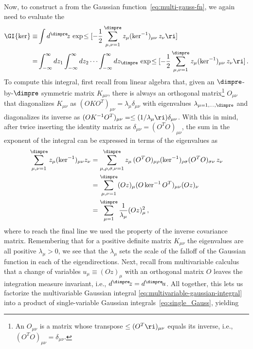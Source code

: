 Now, to construct a  from the Gaussian function~\eqref{eq:multi-gauss-fn}, we again need to evaluate the 
\begin{align}\label{eq:multivariable-gaussian-integral}
\GI{\ker} \equiv& \int d^\dimpre\! z\, \exp\!\le[-\frac{1}{2}\sum_{\mu,\nu=1}^{\dimpre} z_{\mu} (\ker^{-1})_{\mu\nu}\, z_{\nu}\ri]\, \\
=& \int_{-\infty}^{\infty} dz_1  \int_{-\infty}^{\infty} dz_2 \cdots \int_{-\infty}^{\infty} dz_\dimpre \, \exp\!\le[-\frac{1}{2}\sum_{\mu,\nu=1}^{\dimpre} z_{\mu} (\ker^{-1})_{\mu\nu}\, z_{\nu}\ri]\, .\nonumber
\end{align}
To compute this integral, first recall from linear algebra that, given an $\dimpre$-by-$\dimpre$ symmetric matrix $K_{\mu\nu}$, there is always an orthogonal matrix\footnote{An  $O_{\mu\nu}$  is a matrix whose transpose $\le(O^T\ri)_{\mu\nu}$ equals its inverse, i.e.,
$(O^T O)_{\mu\nu}=\delta_{\mu\nu}$.
}
$O_{\mu\nu}$ that diagonalizes $K_{\mu\nu}$ as $(OK O^T)_{\mu\nu}=\lambda_{\mu} \delta_{\mu\nu}$ with eigenvalues $\lambda_{\mu=1,\ldots,\dimpre}$ and diagonalizes its inverse as $(OK^{-1} O^T)_{\mu\nu}=\le(1/\lambda_{\mu}\ri) \delta_{\mu\nu}$.
With this in mind, after twice inserting the identity matrix as $\delta_{\mu\nu} = (O^T O)_{\mu\nu}$,
the sum in the exponent of the integral can be expressed in terms of the eigenvalues as
\begin{align}
\sum_{\mu,\nu=1}^{\dimpre} z_{\mu} (\ker^{-1})_{\mu\nu}z_{\nu}
&=\sum_{\mu,\rho,\sigma,\nu=1}^{\dimpre} z_{\mu} \, (O^T O)_{\mu\rho} (\ker^{-1})_{\rho\sigma}(O^T O)_{\sigma\nu}\, z_{\nu}  \\ \notag
&=\sum_{\mu,\nu=1}^{\dimpre}(Oz)_{\mu} (O \ker^{-1} O^T)_{\mu\nu} (Oz)_{\nu}\\ \notag
&=\sum_{\mu=1}^{\dimpre} \frac{1}{\lambda_{\mu}}(Oz)_{\mu}^2\, ,
\end{align}
where to reach the final line we used the  property of the inverse covariance matrix.
Remembering that for a positive definite matrix $K_{\mu\nu}$ the eigenvalues are all positive $\lambda_\mu > 0$, we see that the $\lambda_\mu$ sets the scale of the falloff of the Gaussian function in each of the eigendirections.
Next, recall from multivariable calculus that a change of variables $u_{\mu}\equiv (O z)_{\mu}$ with an orthogonal matrix $O$ leaves the integration measure invariant, i.e., $d^{\dimpre}\! z=d^{\dimpre}\!u$. All together, this lets us factorize the multivariable Gaussian integral \eqref{eq:multivariable-gaussian-integral} into a product of single-variable Gaussian integrals~\eqref{eq:single_Gauss}, yielding
